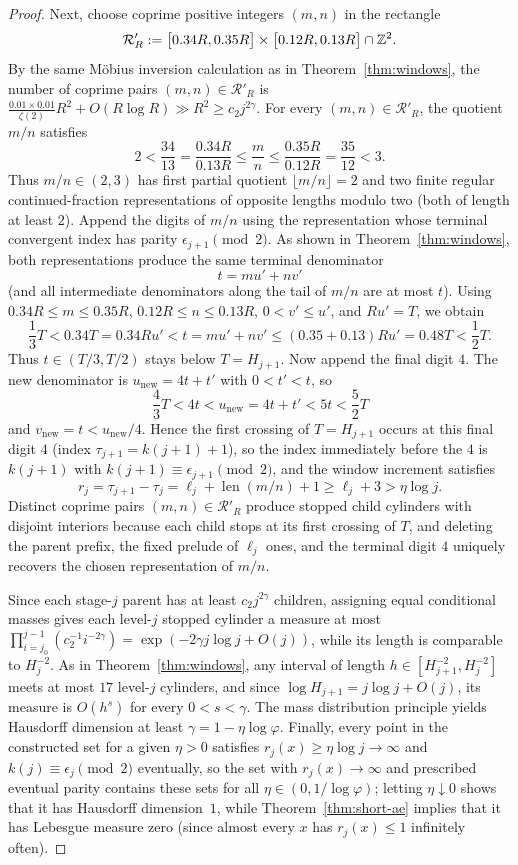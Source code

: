 \begin{proof}
Next, choose coprime positive integers $(m,n)$ in the rectangle
\[
\mathcal R'_R:=\bigl[0.34R,0.35R\bigr]\times\bigl[0.12R,0.13R\bigr]\cap\mathbb{Z}^2.
\]
By the same M\"obius inversion calculation as in Theorem~\ref{thm:windows}, the
number of coprime pairs $(m,n)\in\mathcal R'_R$ is
$\frac{0.01\times0.01}{\zeta(2)}R^2+O(R\log R)\gg R^2\ge c_2 j^{2\gamma}$. For
every $(m,n)\in\mathcal R'_R$, the quotient $m/n$ satisfies
\[
2<\frac{34}{13}=\frac{0.34R}{0.13R}\le\frac{m}{n}\le\frac{0.35R}{0.12R}=\frac{35}{12}<3.
\]
Thus $m/n\in(2,3)$ has first partial quotient $\lfloor m/n\rfloor=2$ and two
finite regular continued-fraction representations of opposite lengths modulo
two (both of length at least $2$). Append the digits of $m/n$ using the
representation whose terminal convergent index has parity
$\epsilon_{j+1}\pmod2$. As shown in Theorem~\ref{thm:windows}, both
representations produce the same terminal denominator
\[
t=mu'+nv'
\]
(and all intermediate denominators along the tail of $m/n$ are at most $t$).
Using $0.34R\le m\le0.35R$, $0.12R\le n\le0.13R$, $0<v'\le u'$, and $Ru'=T$, we
obtain
\[
\frac13 T<0.34T=0.34Ru'<t=mu'+nv'\le(0.35+0.13)Ru'=0.48T<\frac12 T.
\]
Thus $t\in(T/3,T/2)$ stays below $T=H_{j+1}$. Now append the final digit $4$.
The new denominator is $u_{\mathrm{new}}=4t+t'$ with $0<t'<t$, so
\[
\frac43 T<4t<u_{\mathrm{new}}=4t+t'<5t<\frac52 T
\]
and $v_{\mathrm{new}}=t<u_{\mathrm{new}}/4$. Hence the first crossing of
$T=H_{j+1}$ occurs at this final digit $4$ (index $\tau_{j+1}=k(j+1)+1$), so the
index immediately before the $4$ is $k(j+1)$ with
$k(j+1)\equiv\epsilon_{j+1}\pmod2$, and the window increment satisfies
\[
r_j=\tau_{j+1}-\tau_j=\ell_j+\operatorname{len}(m/n)+1\ge\ell_j+3>\eta\log j.
\]
Distinct coprime pairs $(m,n)\in\mathcal R'_R$ produce stopped child cylinders
with disjoint interiors because each child stops at its first crossing of $T$,
and deleting the parent prefix, the fixed prelude of $\ell_j$ ones, and the
terminal digit $4$ uniquely recovers the chosen representation of $m/n$.

Since each stage-$j$ parent has at least $c_2 j^{2\gamma}$ children, assigning
equal conditional masses gives each level-$j$ stopped cylinder a measure at most
$\prod_{i=j_0}^{j-1}(c_2^{-1}i^{-2\gamma})=\exp(-2\gamma j\log j+O(j))$, while
its length is comparable to $H_j^{-2}$. As in Theorem~\ref{thm:windows}, any
interval of length $h\in[H_{j+1}^{-2},H_j^{-2}]$ meets at most $17$ level-$j$
cylinders, and since $\log H_{j+1}=j\log j+O(j)$, its measure is $O(h^s)$ for
every $0<s<\gamma$. The mass distribution principle yields Hausdorff dimension
at least $\gamma=1-\eta\log\varphi$. Finally, every point in the constructed
set for a given $\eta>0$ satisfies $r_j(x)\ge\eta\log j\to\infty$ and
$k(j)\equiv\epsilon_j\pmod2$ eventually, so the set with $r_j(x)\to\infty$ and
prescribed eventual parity contains these sets for all $\eta\in(0,1/\log\varphi)$;
letting $\eta\downarrow0$ shows that it has Hausdorff dimension~$1$, while
Theorem~\ref{thm:short-ae} implies that it has Lebesgue measure zero (since
almost every $x$ has $r_j(x)\le1$ infinitely often).
\end{proof}

